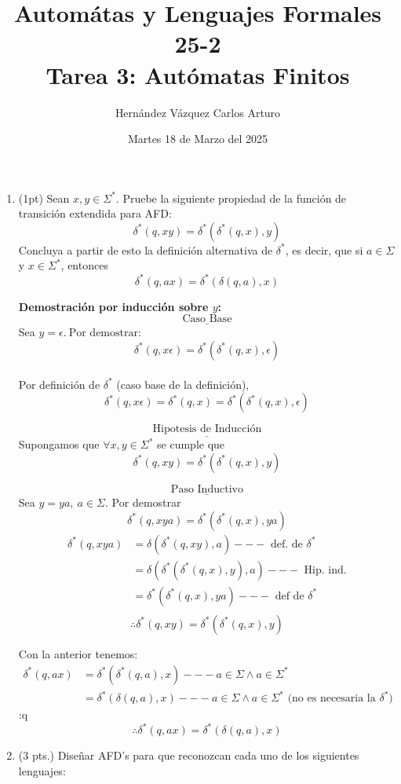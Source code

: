 \documentclass{article}
\title{Automátas y Lenguajes Formales 25-2 \\ Tarea 3: Autómatas Finitos}
\author{Hernández Vázquez Carlos Arturo }
\date{Martes 18 de Marzo del 2025}
\begin{document}
\maketitle

\begin{enumerate}
    \item (1pt) Sean $x,y \in \Sigma ^*$. Pruebe la siguiente propiedad de la función de transición extendida para AFD:
    $$\delta^*(q,xy) = \delta^*(\delta^*(q,x),y)$$
    Concluya a partir de esto la definición alternativa de $\delta^*$, es decir, que si $a \in \Sigma$ y $x \in \Sigma^*$, entonces $$\delta^*(q,ax) = \delta^*(\delta(q,a),x)$$

    \textbf{Demostración por inducción sobre $y$:}
    $$\underline{\text{Caso Base}}$$ Sea $y = \epsilon.~ \text{Por demostrar: }$
    $$\delta^*(q,x\epsilon) = \delta^*(\delta^*(q,x),\epsilon)$$\\
    Por definición de $\delta^*$ (caso base de la definición), $$\delta^*(q,x \epsilon) = \delta^*(q,x) =\delta^*(\delta^*(q,x),\epsilon)$$

    $$\underline{\text{Hipotesis de Inducción}}$$ Supongamos que $\forall x,y \in \Sigma^*$ se cumple que $$\delta^* (q,xy) = \delta^*(\delta^*(q,x),y)$$
    
    $$\underline{\text{Paso Inductivo}}$$ Sea $ y = ya,~a \in \Sigma.$ Por demostrar
    $$\delta^* (q,xya) = \delta^*(\delta^*(q,x),ya)$$
    \begin{align*}
    \delta^*(q,xya) &= \delta (\delta^*(q,xy),a) --- \text{ def. de } \delta^* \\
      &= \delta (\delta^*(\delta^*(q,x),y),a) --- \text{ Hip. ind.} \\
      &= \delta^*(\delta^*(q,x),ya) --- \text{ def de } \delta^* \\
    \end{align*}
    $$\boxed{\therefore \delta^*(q,xy) = \delta^*(\delta^*(q,x),y)}$$

    Con la anterior tenemos:
    \begin{align*}
    \delta^*(q,ax) &= \delta^*(\delta^*(q,a),x) --- a \in \Sigma \land a \in \Sigma^* \\
      &= \delta^*(\delta(q,a),x) --- a \in \Sigma \land a \in \Sigma^* \text{ (no es necesaria la } \delta^*)
    \end{align*}:q
    $$\boxed{\therefore \delta^*(q,ax) = \delta^*(\delta(q,a),x)}$$
    
    \item (3 pts.) Diseñar AFD's para que reconozcan cada uno de los siguientes lenguajes:


\end{enumerate}
\end{document}

